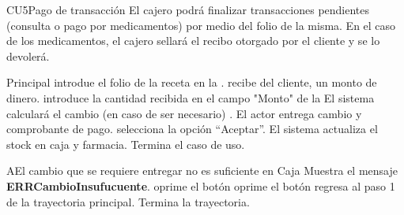 
% 



	\begin{UseCase}{CU5}{Pago de transacci\'on}{
		El cajero podr\'a finalizar transacciones pendientes (consulta o pago por medicamentos) por medio del folio de la misma.
En el caso de los medicamentos, el cajero sellar\'a el recibo otorgado por el cliente y se lo devoler\'a.
	}
	\end{UseCase}

	\begin{UCtrayectoria}{Principal}
		\UCpaso[\UCactor] introdue el folio de la receta en la .
		\UCpaso[\UCactor] recibe del cliente, un monto de dinero.
		\UCpaso[\UCactor]introduce la cantidad recibida en el campo "Monto" de la 
		\UCpaso El sistema calcular\'a el cambio (en caso de ser necesario) 
		\label{IUConsulta} .
		\UCpaso[\UCactor] El actor entrega cambio y comprobante de pago.
		\UCpaso [\UCactor] selecciona la opción "`Aceptar"'.  
		\UCpaso El sistema actualiza el stock en caja y farmacia. 
		\UCpaso[] Termina el caso de uso.
	\end{UCtrayectoria}
		
		\begin{UCtrayectoriaA}{A}{El cambio que se requiere entregar no es suficiente en Caja}
			\UCpaso Muestra el mensaje {\bf ERRCambioInsufucuente}.
			\UCpaso[\UCactor] oprime el botón 
			\UCpaso[\UCactor] oprime el botón 
			\UCpaso[\UCactor] regresa al paso 1 de la trayectoria principal.  
			\UCpaso[] Termina la trayectoria.
		\end{UCtrayectoriaA}
		
		
